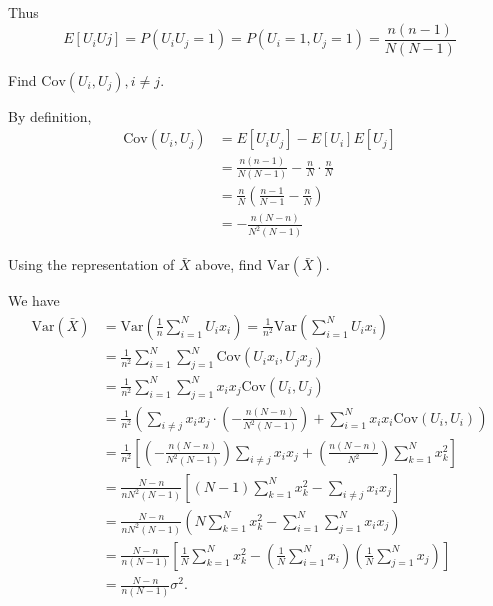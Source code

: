 \documentclass{article}
\newcommand{\var}{\mathrm{Var}}
\newcommand{\cov}{\mathrm{Cov}}
\begin{document}
\begin{itemize}
\begin{enumerate}[a.]
\begin{soln}
				Thus \[E[U_iUj]=P(U_iU_j=1)=P(U_i=1, U_j=1)=\boxed{\frac{n(n-1)}{N(N-1)}}\]
			\end{soln}

			\ii Find $\cov(U_i, U_j), i\neq j.$
			\begin{soln}
				By definition, 
				\begin{align*}
					\cov(U_i, U_j) &= E[U_iU_j]-E[U_i]E[U_j] \\
					&= \frac{n(n-1)}{N(N-1)}-\frac{n}{N}\cdot\frac{n}{N} \\
					&= \frac{n}{N} \left( \frac{n-1}{N-1} - \frac{n}{N} \right) \\
					&= \boxed{-\frac{n(N-n)}{N^2(N-1)}}
				\end{align*}
				
			\end{soln}

			\ii Using the representation of $\bar{X}$ above, find $\var(\bar{X}).$
			\begin{soln}
				We have 
				\begin{align*}
					\var(\bar{X}) &= \var\left(\frac{1}{n}\sum_{i=1}^N U_i x_i\right) = \frac{1}{n^2}\var\left( \sum_{i=1}^N U_i x_i \right) \\
					&= \frac{1}{n^2}\sum_{i=1}^N\sum_{j=1}^N \cov(U_ix_i, U_jx_j) \\
					&= \frac{1}{n^2}\sum_{i=1}^N \sum_{j=1}^N x_i x_j \cov(U_i, U_j) \\
					&= \frac{1}{n^2}\left( \sum_{i\neq j} x_i x_j \cdot\left( -\frac{n(N-n)}{N^2(N-1)} \right) + \sum_{i=1}^N x_i x_i \cov(U_i, U_i) \right) \\
					&= \frac{1}{n^2}\left[ \left( -\frac{n(N-n)}{N^2(N-1)} \right)\sum_{i\neq j}x_ix_j + \left(\frac{n(N-n)}{N^2}\right)\sum_{k=1}^N x_k^2 \right] \\
					&= \frac{N-n}{nN^2(N-1)}\left[ (N-1)\sum_{k=1}^N x_k^2 - \sum_{i\neq j} x_ix_j \right] \\
					&= \frac{N-n}{nN^2(N-1)}\left( N\sum_{k=1}^N x_k^2 - \sum_{i=1}^N \sum_{j=1}^N x_ix_j \right) \\
					&= \frac{N-n}{n(N-1)}\left[ \frac{1}{N}\sum_{k=1}^N x_k^2 - \left( \frac{1}{N}\sum_{i=1}^N x_i \right)\left( \frac{1}{N}\sum_{j=1}^N x_j \right) \right] \\
					&= \boxed{\frac{N-n}{n(N-1)}\sigma^2.}
				\end{align*}

			\end{soln}
			
		\end{enumerate}



\end{itemize}
\end{document}
